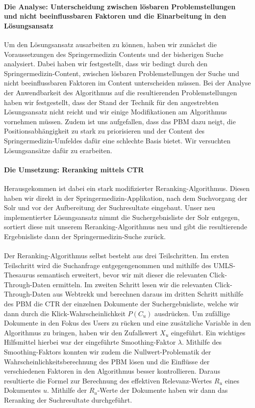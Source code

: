\paragraph{Die Analyse: Unterscheidung zwischen lösbaren Problemstellungen und nicht beeinflussbaren Faktoren und die Einarbeitung in den Lösungsansatz}
Um den Lösungsansatz ausarbeiten zu können, haben wir zunächst die Voraussetzungen des Springermedizin Contents und der bisherigen Suche analysiert. Dabei haben wir festgestellt, dass wir bedingt durch den Springermedizin-Content, zwischen lösbaren Problemstellungen der Suche und nicht beeinflussbaren Faktoren im Content unterscheiden müssen. Bei der Analyse der Anwendbarkeit des Algorithmus auf die resultierenden Problemstellungen haben wir festgestellt, dass der Stand der Technik für den angestrebten Lösungsansatz nicht reicht und wir einige Modifikationen am Algorithmus vornehmen müssen. Zudem ist uns aufgefallen, dass das PBM dazu neigt, die Positionsabhängigkeit zu stark zu priorisieren und der Content des Springermedizin-Umfeldes dafür eine schlechte Basis bietet. Wir versuchten Lösungsansätze dafür zu erarbeiten.

\paragraph{Die Umsetzung: Reranking mittels CTR}
Herausgekommen ist dabei ein stark modifizierter Reranking-Algorithmus. Diesen haben wir direkt in der Springermedizin-Applikation, nach dem Suchvorgang der Solr und vor der Aufbereitung der Suchresultate eingebaut. Unser neu implementierter Lösungsansatz nimmt die Suchergebnisliste der Solr entgegen, sortiert diese mit unserem Reranking-Algorithmus neu und gibt die resultierende Ergebnisliste dann der Springermedizin-Suche zurück. 
\\
\\
Der Reranking-Algorithmus selbst besteht aus drei Teilschritten. Im ersten Teilschritt wird die Suchanfrage entgegengenommen und mithilfe des UMLS-Thesaurus semantisch erweitert, bevor wir mit dieser die relevanten Click-Through-Daten ermitteln. Im zweiten Schritt lesen wir die relevanten Click-Through-Daten aus Webtrekk und berechnen daraus im dritten Schritt mithilfe des PBM die CTR der einzelnen Dokumente der Suchergebnisliste, welche wir dann durch die Klick-Wahrscheinlichkeit $P(C_{u})$ ausdrücken. Um zufällige Dokumente in den Fokus des Users zu rücken und eine zusätzliche Variable in den Algorithmus zu bringen, haben wir den Zufallswert $X_u$ eingeführt. Ein wichtiges Hilfsmittel hierbei war der eingeführte Smoothing-Faktor $\lambda$. Mithilfe des Smoothing-Faktors konnten wir zudem die Nullwert-Problematik der Wahrscheinlichkeitsberechnung des PBM lösen und die Einflüsse der verschiedenen Faktoren in den Algorithmus besser kontrollieren. Daraus resultierte die Formel zur Berechnung des effektiven Relevanz-Wertes  $R_u$ eines Dokumentes $u$. Mithilfe der $R_u$-Werte der Dokumente haben wir dann das Reranking der Suchresultate durchgeführt.

